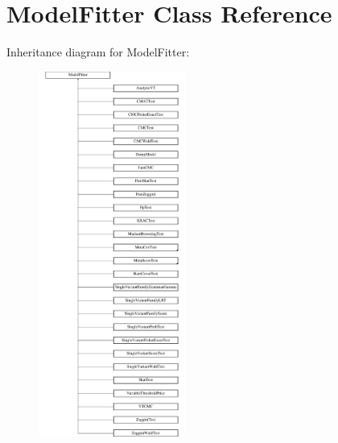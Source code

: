 \hypertarget{classModelFitter}{\section{Model\-Fitter Class Reference}
\label{classModelFitter}
}
Inheritance diagram for Model\-Fitter\-:\begin{figure}[H]
\begin{center}
\leavevmode
\includegraphics[height=12.000000cm]{classModelFitter}
\end{center}
\end{figure}
